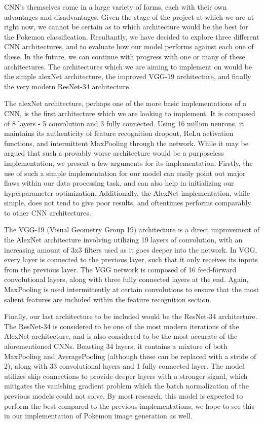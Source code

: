 \documentclass{article} %
\begin{document}
CNN's themselves come in a large variety of forms, each with their own advantages and disadvantages. Given the stage of the project at which we are at right now, we cannot be certain as to which architecture would be the best for the Pokemon classification. Resultantly, we have decided to explore three different CNN architectures, and to evaluate how our model performs against each one of these. In the future, we can continue with progress with one or many of these architectures. The architectures which we are aiming to implement on would be the simple alexNet architecture, the improved VGG-19 architecture, and finally the very modern ResNet-34 architecture. 

The alexNet architecture, perhaps one of the more basic implementations of a CNN, is the first architecture which we are looking to implement. It is composed of 8 layers - 5 convolution and 3 fully connected. Using 16 million neurons, it maintains its authenticity of feature recognition dropout, ReLu activation functions, and intermittent MaxPooling through the network. While it may be argued that such a provably worse architecture would be a purposeless implementation, we present a few arguments for its implementation. Firstly, the use of such a simple implementation for our model can easily point out major flaws within our data processing task, and can also help in initializing our hyperparameter optimization. Additionally, the AlexNet implementation, while simple, does not tend to give poor results, and oftentimes performs comparably to other CNN architectures.

The VGG-19 (Visual Geometry Group 19) architecture is a direct improvement of the AlexNet architecture involving utilizing 19 layers of convolution, with an increasing amount of 3x3 filters used as it goes deeper into the network. In VGG, every layer is connected to the previous layer, such that it only receives its inputs from the previous layer. The VGG network is composed of 16 feed-forward convolutional layers, along with three fully connected layers at the end. Again, MaxPooling is used intermittently at certain convolutions to ensure that the most salient features are included within the feature recognition section. 

Finally, our last architecture to be included would be the ResNet-34 architecture. The ResNet-34 is considered to be one of the most modern iterations of the AlexNet architecture, and is also considered to be the most accurate of the aforementioned CNNs. Boasting 34 layers, it contains a mixture of both MaxPooling and AveragePooling (although these can be replaced with a stride of 2), along with 33 convolutional layers and 1 fully connected layer. The model utilizes skip connections to provide deeper layers with a stronger signal, which mitigates the vanishing gradient problem which the batch normalization of the previous models could not solve. By most research, this model is expected to perform the best compared to the previous implementations; we hope to see this in our implementation of Pokemon image generation as well. 
\end{document}
